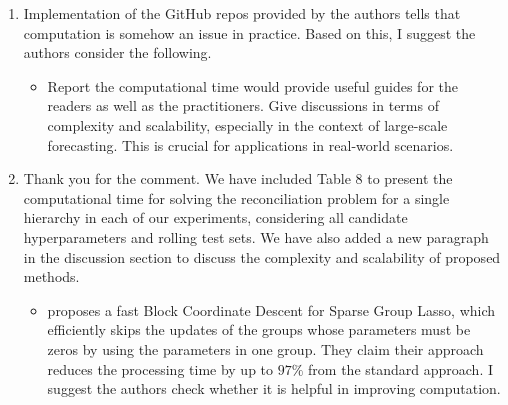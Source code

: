 \documentclass[11pt,a4paper,]{article}
\providecommand{\tightlist}{%
  \setlength{\itemsep}{0pt}\setlength{\parskip}{0pt}}
\renewenvironment{quote}
               {\list{}{\rightmargin\leftmargin}%
                \item\relax\color[RGB]{0,150,0}}
               {\endlist}
\begin{document}
\begin{enumerate}
\def\labelenumi{\arabic{enumi}.}
\setcounter{enumi}{2}
\item
  Implementation of the GitHub repos provided by the authors tells that
  computation is somehow an issue in practice. Based on this, I suggest
  the authors consider the following.

  \begin{itemize}
  \tightlist
  \item
    Report the computational time would provide useful guides for the
    readers as well as the practitioners. Give discussions in terms of
    complexity and scalability, especially in the context of large-scale
    forecasting. This is crucial for applications in real-world
    scenarios.
  \end{itemize}

  \begin{quote}
  Thank you for the comment. We have included Table 8 to present the
  computational time for solving the reconciliation problem for a single
  hierarchy in each of our experiments, considering all candidate
  hyperparameters and rolling test sets. We have also added a new
  paragraph in the discussion section to discuss the complexity and
  scalability of proposed methods.
  \end{quote}

  \begin{itemize}
  \tightlist
  \item
    \textcite{Ida2019-fa} proposes a fast Block Coordinate Descent for
    Sparse Group Lasso, which efficiently skips the updates of the
    groups whose parameters must be zeros by using the parameters in one
    group. They claim their approach reduces the processing time by up
    to \(97\%\) from the standard approach. I suggest the authors check
    whether it is helpful in improving computation.
  \end{itemize}


\end{enumerate}
\end{document}

